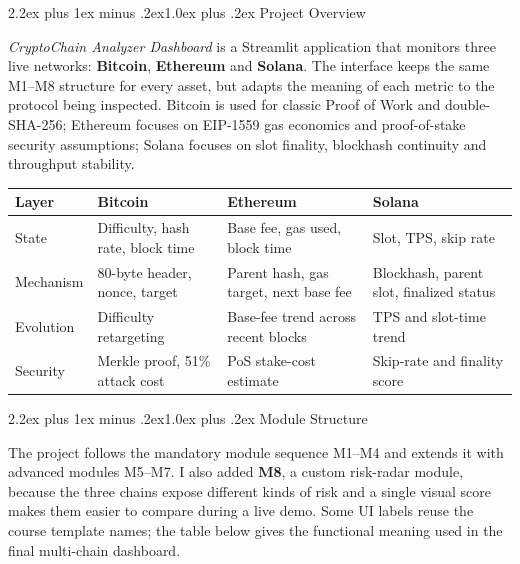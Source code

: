 \documentclass[11pt,a4paper]{article}
\makeatletter
\renewcommand{\section}{\@startsection{section}{1}{0pt}%
  {2.2ex plus 1ex minus .2ex}{1.0ex plus .2ex}%
  {\color{btcgreen}\large\bfseries\sffamily}}
\makeatother
\begin{document}
\begin{titlepage}
\vspace{0.6cm}
\end{titlepage}


\section{Project Overview}

\emph{CryptoChain Analyzer Dashboard} is a Streamlit application that monitors
three live networks: \textbf{Bitcoin}, \textbf{Ethereum} and \textbf{Solana}.
The interface keeps the same M1--M8 structure for every asset, but adapts the
meaning of each metric to the protocol being inspected. Bitcoin is used for
classic Proof of Work and double-SHA-256; Ethereum focuses on EIP-1559 gas
economics and proof-of-stake security assumptions; Solana focuses on slot
finality, blockhash continuity and throughput stability.

\begin{center}
\small
\renewcommand{\arraystretch}{1.18}
\begin{tabular}{@{}p{2.0cm}p{3.9cm}p{3.9cm}p{3.9cm}@{}}
\toprule
\textbf{Layer} & \textbf{Bitcoin} & \textbf{Ethereum} & \textbf{Solana} \\
\midrule
State & Difficulty, hash rate, block time & Base fee, gas used, block time & Slot, TPS, skip rate \\
Mechanism & 80-byte header, nonce, target & Parent hash, gas target, next base fee & Blockhash, parent slot, finalized status \\
Evolution & Difficulty retargeting & Base-fee trend across recent blocks & TPS and slot-time trend \\
Security & Merkle proof, 51\% attack cost & PoS stake-cost estimate & Skip-rate and finality score \\
\bottomrule
\end{tabular}
\end{center}

\section{Module Structure}

The project follows the mandatory module sequence M1--M4 and extends it with
advanced modules M5--M7. I also added \textbf{M8}, a custom risk-radar module,
because the three chains expose different kinds of risk and a single visual
score makes them easier to compare during a live demo. Some UI labels reuse
the course template names; the table below gives the functional meaning used
in the final multi-chain dashboard.
\end{document}
